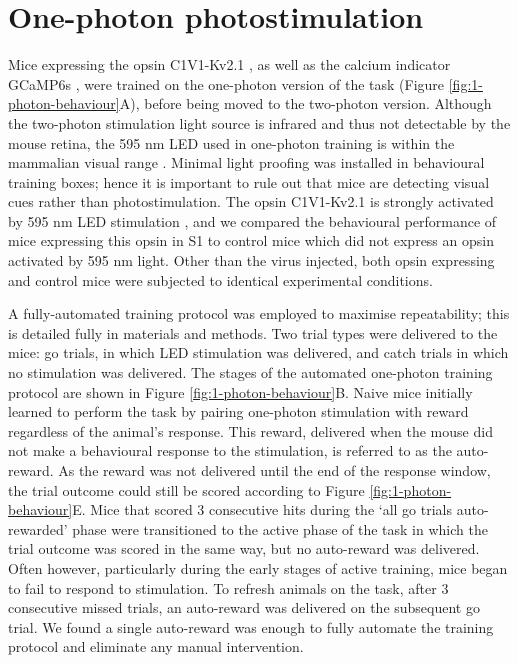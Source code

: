 \section{One-photon photostimulation}

Mice expressing the opsin C1V1-Kv2.1 \cite{yizhar_neocortical_2011, chettih_single-neuron_2019}, as well as the calcium indicator GCaMP6s \cite{chen_ultrasensitive_2013}, were trained on the one-photon version of the task (Figure \ref{fig:1-photon-behaviour}A), before being moved to the two-photon version. Although the two-photon stimulation light source is infrared and thus not detectable by the mouse retina, the 595 nm LED used in one-photon training is within the mammalian visual range \cite{peirson_light_2018}. Minimal light proofing was installed in behavioural training boxes; hence it is important to rule out that mice are detecting visual cues rather than photostimulation. The opsin C1V1-Kv2.1 is strongly activated by 595 nm LED stimulation \cite{yizhar_neocortical_2011, chettih_single-neuron_2019}, and we compared the behavioural performance of mice expressing this opsin in S1 to control mice which did not express an opsin activated by 595 nm light. Other than the virus injected, both opsin expressing and control mice were subjected to identical experimental conditions. 

A fully-automated training protocol was employed to maximise repeatability; this is detailed fully in materials and methods. Two trial types were delivered to the mice: go trials, in which LED stimulation was delivered, and catch trials in which no stimulation was delivered. The stages of the automated one-photon training protocol are shown in Figure \ref{fig:1-photon-behaviour}B. Naive mice initially learned to perform the task by pairing one-photon stimulation with reward regardless of the animal's response. This reward, delivered when the mouse did not make a behavioural response to the stimulation, is referred to as the auto-reward. As the reward was not delivered until the end of the response window, the trial outcome could still be scored according to Figure \ref{fig:1-photon-behaviour}E. Mice that scored 3 consecutive hits during the `all go trials auto-rewarded' phase were transitioned to the active phase of the task in which the trial outcome was scored in the same way, but no auto-reward was delivered. Often however, particularly during the early stages of active training, mice began to fail to respond to stimulation. To refresh animals on the task, after 3 consecutive missed trials, an auto-reward was delivered on the subsequent go trial. We found a single auto-reward was enough to fully automate the training protocol and eliminate any manual intervention. 

